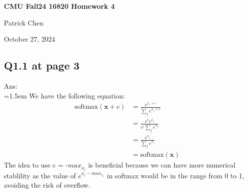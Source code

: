 \documentclass{article}
\begin{document}
	\begin{titlepage}
    	\vspace*{\fill} %
    	\begin{center}
        	{\huge \textbf{CMU Fall24 16820 Homework 4} \par}
       		\vspace{0.5cm}
        		{\large Patrick Chen \par}
        		\vspace{0.5cm}
        		{\large October 27, 2024 \par}
    	\end{center}
    	\vspace*{\fill} %
	\end{titlepage}
	
	\newpage
	\subsection*{Q1.1 at page 3}
	Ans:\\
	\hangindent=1.5em \hspace{1.5em} We have the following equation:\\
	\begin{align}
		\text{softmax}(\mathbf{x} + c)  &= \frac{e^{x_i+c}}{\sum_j e^{x_j+c}} \\
		&= \frac{e^ce^{x_i}}{e^c\sum_j e^{x_j}} \\
		&= \frac{e^{x_i}}{\sum_j e^{x_j}}\\
		&= \text{softmax}(\mathbf{x})
	\end{align}
	The idea to use c = -$max_{x_i}$ is beneficial because we can have more numerical stablility as the value of $e^{x_i-max_{x_{i}}}$ in softmax would be in the range from 0 to 1, avoiding the risk of overflow.

	\newpage
\end{document}
